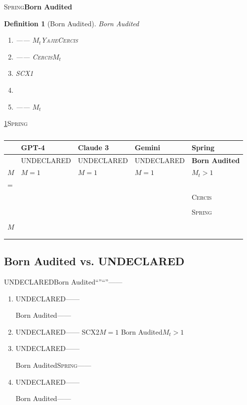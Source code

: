 \documentclass[12pt,a4paper]{article}
\newtheorem{definition}[theorem]{Definition}
\theoremstyle{remark}
\newcommand{\Spring}{\textsc{Spring}}
\newcommand{\Yajie}{\textsc{Yajie}}
\newcommand{\Cercis}{\textsc{Cercis}}
\begin{document}
\Spring{}\textbf{Born Audited}

\begin{definition}[Born Audited]\label{def:born_audited}
Born Audited
\begin{enumerate}[label=(\roman*),nosep]
    \item \textbf{} ——
    $M_t$\Yajie{}\Cercis{}
    \item \textbf{} ——
    \Cercis{}$M_t$
    \item \textbf{} 
    SCX1
    \item \textbf{} 
    \item \textbf{} ——
    $M_t$
\end{enumerate}
\end{definition}

\ref{tab:audit_status_comparison}\Spring{}

\begin{table}[H]
\centering
\caption{}
\label{tab:audit_status_comparison}
\renewcommand{\arraystretch}{1.5}
\small
\begin{tabular}{@{}p{2.2cm} p{3cm} p{3cm} p{3cm} p{3.5cm}@{}}
\toprule
\textbf{} & \textbf{GPT-4} & \textbf{Claude 3} & \textbf{Gemini} & \textbf{Spring} \\
\midrule
 & UNDECLARED & UNDECLARED & UNDECLARED & \textbf{Born Audited} \\
\midrule
$M$ & $M=1$ & $M=1$ & $M=1$ & $M_t > 1$ \\
\midrule
= &  &  &  & \textbf{} \\
\midrule
 &  &  &  & \Cercis{} \\
\midrule
 &  &  &  &  \\
\midrule
 &  &  &  & \Spring{} \\
\midrule
 &  &  &  &  \\
\midrule
$M$ &  &  &  &  \\
\midrule
 &  &  &  &  \\
\midrule
 &  &  &  &  \\
\bottomrule
\end{tabular}
\end{table}

\subsection{Born Audited vs. UNDECLARED}

UNDECLAREDBorn Audited“”“”——


\begin{enumerate}[label=(\arabic*),itemsep=3pt]
    \item \textbf{} UNDECLARED——
    
    Born Audited——
    
    \item \textbf{} UNDECLARED——
    SCX2$M=1$
    Born Audited$M_t>1$
    
    \item \textbf{} UNDECLARED——
    
    Born Audited\Spring{}——
    
    
    \item \textbf{} UNDECLARED——
    
    Born Audited——
\end{enumerate}
\end{document}
